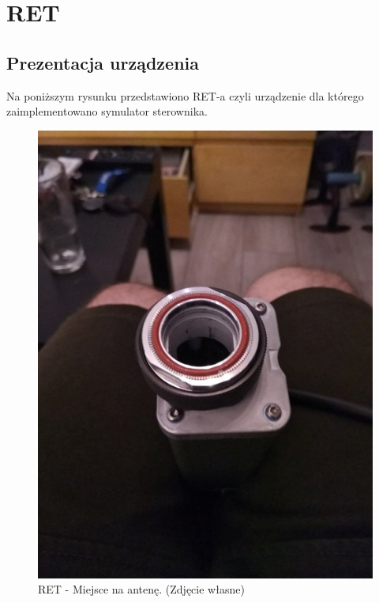 \chapter{RET}
	\section{Prezentacja urządzenia}
		Na poniższym rysunku przedstawiono RET-a czyli urządzenie dla którego zaimplementowano symulator sterownika.\cite{KATHREIN_RET_1}
		\begin{figure}[h!]
		\centering
		\includegraphics[scale=0.4]{Obrazki/RET_1.png}
		\caption{RET - Miejsce na antenę.
			\newline(Zdjęcie własne)}
		\end{figure}

